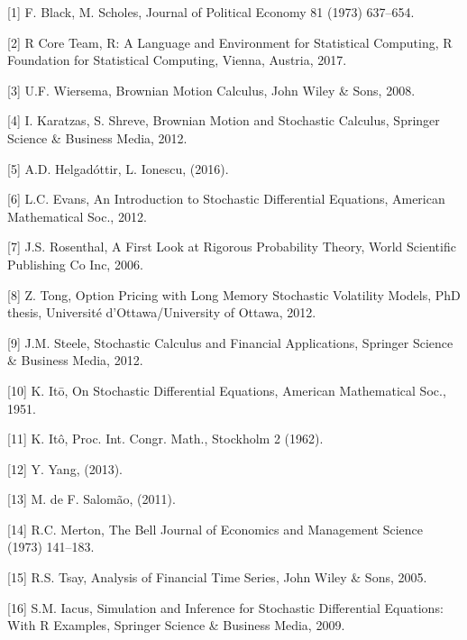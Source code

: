 \documentclass[12pt,twoside]{reedthesis}
\theoremstyle{definition}
\theoremstyle{definition}
\theoremstyle{remark}
\begin{document}
  \hypertarget{refs}{}
  \hypertarget{ref-black1973pricing}{}
  {[}1{]} F. Black, M. Scholes, Journal of Political Economy 81 (1973)
  637--654.
  
  \hypertarget{ref-rlang}{}
  {[}2{]} R Core Team, R: A Language and Environment for Statistical
  Computing, R Foundation for Statistical Computing, Vienna, Austria,
  2017.
  
  \hypertarget{ref-ubbo}{}
  {[}3{]} U.F. Wiersema, Brownian Motion Calculus, John Wiley \& Sons,
  2008.
  
  \hypertarget{ref-karatzas2012brownian}{}
  {[}4{]} I. Karatzas, S. Shreve, Brownian Motion and Stochastic Calculus,
  Springer Science \& Business Media, 2012.
  
  \hypertarget{ref-helgadottir2016option}{}
  {[}5{]} A.D. Helgadóttir, L. Ionescu, (2016).
  
  \hypertarget{ref-evans}{}
  {[}6{]} L.C. Evans, An Introduction to Stochastic Differential
  Equations, American Mathematical Soc., 2012.
  
  \hypertarget{ref-rosenthal}{}
  {[}7{]} J.S. Rosenthal, A First Look at Rigorous Probability Theory,
  World Scientific Publishing Co Inc, 2006.
  
  \hypertarget{ref-tong2012option}{}
  {[}8{]} Z. Tong, Option Pricing with Long Memory Stochastic Volatility
  Models, PhD thesis, Université d'Ottawa/University of Ottawa, 2012.
  
  \hypertarget{ref-steele2012stochastic}{}
  {[}9{]} J.M. Steele, Stochastic Calculus and Financial Applications,
  Springer Science \& Business Media, 2012.
  
  \hypertarget{ref-ito1951}{}
  {[}10{]} K. Itō, On Stochastic Differential Equations, American
  Mathematical Soc., 1951.
  
  \hypertarget{ref-ito1962}{}
  {[}11{]} K. Itô, Proc. Int. Congr. Math., Stockholm 2 (1962).
  
  \hypertarget{ref-yang2013valuing}{}
  {[}12{]} Y. Yang, (2013).
  
  \hypertarget{ref-salomao2011precificaccao}{}
  {[}13{]} M. de F. Salomão, (2011).
  
  \hypertarget{ref-merton1973theory}{}
  {[}14{]} R.C. Merton, The Bell Journal of Economics and Management
  Science (1973) 141--183.
  
  \hypertarget{ref-tsay2005analysis}{}
  {[}15{]} R.S. Tsay, Analysis of Financial Time Series, John Wiley \&
  Sons, 2005.
  
  \hypertarget{ref-iacus2009simulation}{}
  {[}16{]} S.M. Iacus, Simulation and Inference for Stochastic
  Differential Equations: With R Examples, Springer Science \& Business
  Media, 2009.
  
\end{document}
